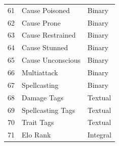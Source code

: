 \documentclass{article}
\begin{document}
\begin{table}[!htbp]
\begin{footnotesize}
\begin{minipage}[b]{0.45\linewidth}
\begin{longtable}{@{}rll@{}}
	61 & Cause Poisoned & Binary \\
	62 & Cause Prone & Binary \\
	63 & Cause Restrained & Binary \\
	64 & Cause Stunned & Binary \\
	65 & Cause Unconscious & Binary \\
	66 & Multiattack & Binary \\
	67 & Spellcasting & Binary \\
	68 & Damage Tags & Textual \\
	69 & Spellcasting Tags & Textual \\
	70 & Trait Tags & Textual \\
	71 & Elo Rank & Integral \\
	\bottomrule
\end{longtable}
\end{minipage}
\end{footnotesize}

\end{table}
\end{document}
